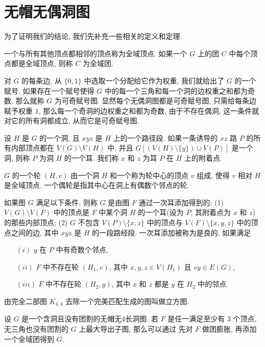 \documentclass[12pt,a4paper]{article}%
\begin{document}
\section{无帽无偶洞图}

为了证明我们的结论, 我们先补充一些相关的定义和定理.

一个与所有其他顶点都相邻的顶点称为全域顶点. 如果一个 $G$ 上的团 $C$ 中每个顶点都是全域顶点, 则称 $C$ 为全域团.

对 $G$ 的每条边, 从 $\{0,1\}$ 中选取一个分配给它作为权重, 我们就给出了 $G$ 的一个赋号. 如果存在一个赋号使得 $G$ 中的每一个三角和每一个洞的边权重之和都为奇数, 那么就称 $G$ 为可奇赋号图. 显然每个无偶洞图都是可奇赋号图, 只需给每条边赋予权重 $1$, 那么每一个奇洞的边权重之和都为奇数, 由于不存在偶洞, 这一条件就对它的所有洞都成立, 从而它是可奇赋号图.

设 $H$ 是 $G$ 的一个洞, 且 $xyz$ 是 $H$ 上的一个路径段. 如果一条诱导的 $xz$ 路 $P$ 的所有内部顶点都在 $V(G) \setminus V(H)$ 中, 并且 $G[(V(H)\setminus \{y\}) \cup V(P)]$ 是一个洞, 则称 $P$ 为洞 $H$ 的一个耳. 我们称 $x$ 和 $z$ 为耳 $P$ 在 $H$ 上的附着点.

$G$ 的一个轮 $(H,v)$ 由一个洞 $H$ 和一个称为轮中心的顶点 $v$ 组成, 使得 $v$ 相对 $H$ 是全域顶点. 一个偶轮是指其中心在洞上有偶数个邻点的轮.

如果图 $G$ 满足以下条件, 则称 $G$ 是由图 $F$ 通过一次耳添加得到的: (1) $V(G) \setminus V(F)$ 中的顶点是 $F$ 中某个洞 $H$ 的一个耳(设为 $P$, 其附着点为 $x$ 和 $z$) 的那些内部顶点; (2) $G$ 不包含 $V(P) \setminus \{x,z\}$ 中的顶点与 $V(F) \setminus \{x,y,z\}$ 中的顶点之间的边, 其中 $xyz$ 是 $H$ 的一段路经段. 一次耳添加被称为是良的, 如果满足
\begin{itemize}
    \item[$(i)$] $y$ 在 $P$ 中有奇数个邻点,
    \item[$(ii)$] $F$ 中不存在轮 $(H_1,v)$, 其中 $x,y,z \in V(H_1)$ 且 $vy \in E(G)$, 
    \item[$(iii)$] $F$ 中不存在轮 $(H_2,y)$, 其中 $x$ 和 $z$ 都是 $y$ 在 $H_2$ 中的邻点.
\end{itemize}

由完全二部图 $K_{4,4}$ 去除一个完美匹配生成的图叫做立方图.

\begin{thm}\label{cap_4hole}
    设 $G$ 是一个含洞且没有团割的无帽无$4$长洞图. 若 $F$ 是任一满足至少有 $3$ 个顶点, 无三角也没有团割的 $G$ 上最大导出子图, 那么可以通过 先对 $F$ 做团膨胀, 再添加一个全域团得到 $G$.
\end{thm}
\end{document}
